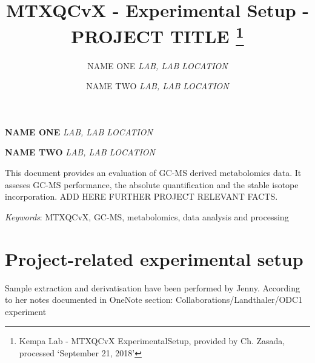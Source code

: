 \documentclass[10pt,]{article}
\title{MTXQCvX - Experimental Setup - PROJECT TITLE \thanks{Kempa Lab - MTXQCvX ExperimentalSetup, provided by Ch. Zasada, processed
`September 21, 2018'}  }
\author{\Large NAME ONE\vspace{0.05in} \newline\normalsize\emph{LAB, LAB LOCATION}   \and \Large NAME TWO\vspace{0.05in} \newline\normalsize\emph{LAB, LAB LOCATION}  }
\date{}
\newcommand*{\authorfont}{\fontfamily{phv}\selectfont}
\renewenvironment{abstract}
 {{%
    \setlength{\leftmargin}{0mm}
    \setlength{\rightmargin}{\leftmargin}%
  }%
  \relax}
 {\endlist}
\begin{document}
	
%

{%
\setlength{\parindent}{0pt}
\thispagestyle{plain}
{\fontsize{18}{20}\selectfont\raggedright 
\maketitle  %

}

{
   \vskip 13.5pt\relax \normalsize\fontsize{11}{12} 
\textbf{\authorfont NAME ONE} \hskip 15pt \emph{\small LAB, LAB LOCATION}   \par \textbf{\authorfont NAME TWO} \hskip 15pt \emph{\small LAB, LAB LOCATION}   

}

}



{
\hypersetup{linkcolor=black}
\setcounter{tocdepth}{2}
\tableofcontents
}




\begin{abstract}

    \hbox{\vrule height .2pt width 39.14pc}

    \vskip 8.5pt %

\noindent This document provides an evaluation of GC-MS derived metabolomics data.
It asseses GC-MS performance, the absolute quantification and the stable
isotope incorporation. ADD HERE FURTHER PROJECT RELEVANT FACTS.


\vskip 8.5pt \noindent \emph{Keywords}: MTXQCvX, GC-MS, metabolomics, data analysis and processing \par

    \hbox{\vrule height .2pt width 39.14pc}



\end{abstract}


\vskip 6.5pt

\noindent  \section{Project-related experimental
setup}\label{project-related-experimental-setup}

Sample extraction and derivatisation have been performed by Jenny.
According to her notes documented in OneNote section:
Collaborations/Landthaler/ODC1 experiment
\end{document}
